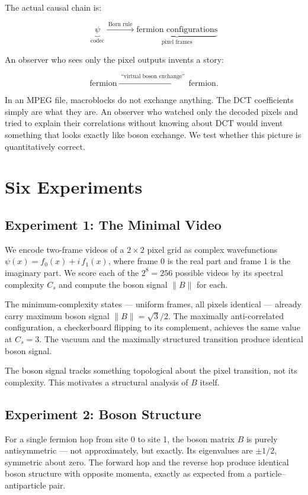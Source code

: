 The actual causal chain is:

\[
\underbrace{\psi}_{\text{codec}}
\xrightarrow{\;\text{Born rule}\;}
\underbrace{\text{fermion configurations}}_{\text{pixel frames}}
\]

An observer who sees only the pixel outputs invents a story:

\[
\text{fermion}
\xrightarrow{\;\text{``virtual boson exchange''}\;}
\text{fermion}.
\]

In an MPEG file, macroblocks do not exchange anything. The DCT
coefficients simply are what they are. An observer who watched only the
decoded pixels and tried to explain their correlations without knowing
about DCT would invent something that looks exactly like boson exchange.
We test whether this picture is quantitatively correct.

\section{Six Experiments}

\subsection{Experiment 1: The Minimal Video}

We encode two-frame videos of a $2 \times 2$ pixel grid as complex
wavefunctions $\psi(x) = f_0(x) + i\,f_1(x)$, where frame 0 is the
real part and frame 1 is the imaginary part. We score each of the
$2^8 = 256$ possible videos by its spectral complexity $C_s$ and compute
the boson signal $\|B\|$ for each.

The minimum-complexity states --- uniform frames, all pixels identical
--- already carry maximum boson signal $\|B\| = \sqrt{3}/2$. The
maximally anti-correlated configuration, a checkerboard flipping to its
complement, achieves the same value at $C_s = 3$. The vacuum and the
maximally structured transition produce identical boson signal.

The boson signal tracks something topological about the pixel
transition, not its complexity. This motivates a structural analysis of
$B$ itself.

\subsection{Experiment 2: Boson Structure}

For a single fermion hop from site 0 to site 1, the boson matrix $B$
is purely antisymmetric --- not approximately, but exactly. Its
eigenvalues are $\pm 1/2$, symmetric about zero. The forward hop and
the reverse hop produce identical boson structure with opposite momenta,
exactly as expected from a particle--antiparticle pair.

